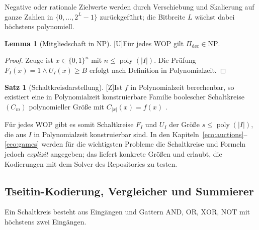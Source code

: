 \documentclass[a4paper,12pt]{article}
\theoremstyle{definition}
\newtheorem{satz}[definition]{Satz}
\newtheorem{lemma}[definition]{Lemma}
\newcommand{\tU}{\textsf{\small[U]}}   %
\newcommand{\tZ}{\textsf{\small[Z]}}   %
\newcommand{\bits}{\{0,1\}}
\newcommand{\cNP}{\ensuremath{\mathrm{NP}}}
\newcommand{\poly}{\operatorname{poly}}
\begin{document}
Negative oder rationale Zielwerte werden durch Verschiebung und Skalierung auf ganze Zahlen in \(\{0,\dots,2^L-1\}\) zurückgeführt; die Bitbreite \(L\) wächst dabei höchstens polynomiell.

\begin{lemma}[Mitgliedschaft in NP]\tU\label{lem:wop-np}
Für jedes WOP gilt \(\Pi_{\mathrm{dec}}\in\cNP\).
\end{lemma}
\begin{proof}
Zeuge ist \(x\in\bits^n\) mit \(n\le\poly(|I|)\). Die Prüfung \(F_I(x)=1\wedge U_I(x)\ge B\) erfolgt nach Definition in Polynomialzeit.
\end{proof}

\begin{satz}[Schaltkreisdarstellung]\tZ\label{satz:circuit}
Ist \(f\) in Polynomialzeit berechenbar, so existiert eine in Polynomialzeit konstruierbare Familie boolescher Schaltkreise \((C_m)\) polynomieller Größe mit \(C_{|x|}(x)=f(x)\) \cite{papadimitriou,arorabarak}.
\end{satz}

Für jedes WOP gibt es somit Schaltkreise \(F_I\) und \(U_I\) der Größe \(s\le\poly(|I|)\), die aus \(I\) in Polynomialzeit konstruierbar sind. In den Kapiteln~\ref{eco:auctions}--\ref{eco:games} werden für die wichtigsten Probleme die Schaltkreise und Formeln jedoch \emph{explizit} angegeben; das liefert konkrete Größen und erlaubt, die Kodierungen mit dem Solver des Repositories zu testen.

\subsection{Tseitin-Kodierung, Vergleicher und Summierer}

Ein Schaltkreis besteht aus Eingängen und Gattern \(\mathrm{AND}\), \(\mathrm{OR}\), \(\mathrm{XOR}\), \(\mathrm{NOT}\) mit höchstens zwei Eingängen.
\end{document}

